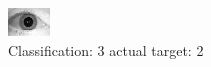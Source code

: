 \begin{figure}[h!]
\begin{center}
\includegraphics[width=0.60\columnwidth]{figures/ID1613_class_3_target_2.png}
\end{center}
\caption{ Classification: 3 actual target: 2}
\label{fig:ID1613_class_3_target_2}
\end{figure}
